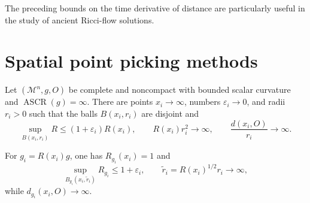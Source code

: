 \begin{remark}
\label{rem:chow-iii-changing-distances-ancient-solutions}


The preceding bounds on the time derivative of distance are particularly
useful in the study of ancient Ricci-flow solutions.
\end{remark}

\section{Spatial point picking methods}

\begin{theorem}
\label{thm:chow-iii-point-picking-infinite-ascr}

Let \((\mathcal M^n,g,O)\) be complete and noncompact with bounded scalar
curvature and \(\operatorname{ASCR}(g)=\infty\).  There are points
\(x_i\to\infty\), numbers \(\varepsilon_i\to0\), and radii \(r_i>0\) such
that the balls \(B(x_i,r_i)\) are disjoint and
\[
 \sup_{B(x_i,r_i)}R\le(1+\varepsilon_i)R(x_i),\qquad
 R(x_i)r_i^2\to\infty,\qquad \frac{d(x_i,O)}{r_i}\to\infty.
\]
\end{theorem}

\begin{remark}
\label{rem:chow-iii-rescaled-point-picked-balls}


For \(g_i=R(x_i)g\), one has \(R_{g_i}(x_i)=1\) and
\[
 \sup_{B_{g_i}(x_i,\widetilde r_i)}R_{g_i}\le1+\varepsilon_i,
 \qquad \widetilde r_i=R(x_i)^{1/2}r_i\to\infty,
\]
while \(d_{g_i}(x_i,O)\to\infty\).
\end{remark}

